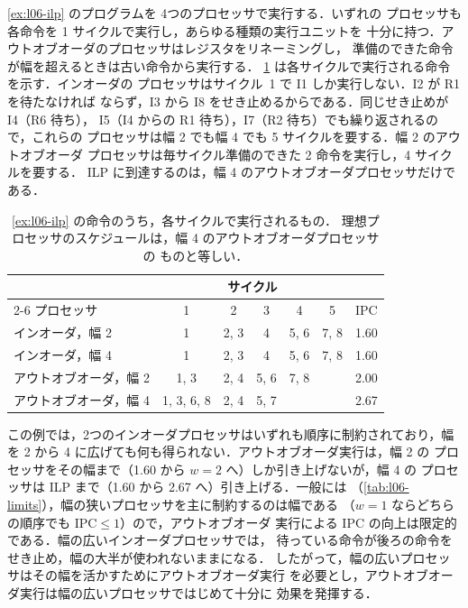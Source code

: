 \documentclass[../main.tex]{subfiles}
\begin{document}
\begin{example}
  \label{ex:l06-ipc}
  \cref{ex:l06-ilp} のプログラムを 4つのプロセッサで実行する．いずれの
  プロセッサも各命令を 1 サイクルで実行し，あらゆる種類の実行ユニットを
  十分に持つ．アウトオブオーダのプロセッサはレジスタをリネーミングし，
  準備のできた命令が幅を超えるときは古い命令から実行する．
  \cref{tab:l06-ipc} は各サイクルで実行される命令を示す．インオーダの
  プロセッサはサイクル~1 で I1 しか実行しない．I2 が R1 を待たなければ
  ならず，I3 から I8 をせき止めるからである．同じせき止めが I4（R6 待ち），
  I5（I4 からの R1 待ち），I7（R2 待ち）でも繰り返されるので，これらの
  プロセッサは幅 2 でも幅 4 でも 5 サイクルを要する．幅 2 のアウトオブオーダ
  プロセッサは毎サイクル準備のできた 2 命令を実行し，4 サイクルを要する．
  ILP に到達するのは，幅 4 のアウトオブオーダプロセッサだけである．
\end{example}

\begin{table}[htbp]
  \centering\small
  \caption{\cref{ex:l06-ilp} の命令のうち，各サイクルで実行されるもの．
    理想プロセッサのスケジュールは，幅 4 のアウトオブオーダプロセッサの
    ものと等しい．}
  \label{tab:l06-ipc}
  \begin{tabular}{@{}lcccccc@{}}
    \toprule
    & \multicolumn{5}{c}{サイクル} & \\
    \cmidrule(lr){2-6}
    プロセッサ & 1 & 2 & 3 & 4 & 5 & IPC \\
    \midrule
    インオーダ，幅 2       & 1          & 2, 3 & 4    & 5, 6 & 7, 8 & 1.60 \\
    インオーダ，幅 4       & 1          & 2, 3 & 4    & 5, 6 & 7, 8 & 1.60 \\
    アウトオブオーダ，幅 2 & 1, 3       & 2, 4 & 5, 6 & 7, 8 &      & 2.00 \\
    アウトオブオーダ，幅 4 & 1, 3, 6, 8 & 2, 4 & 5, 7 &      &      & 2.67 \\
    \bottomrule
  \end{tabular}
\end{table}

この例では，2つのインオーダプロセッサはいずれも順序に制約されており，幅を
2 から 4 に広げても何も得られない．アウトオブオーダ実行は，幅 2 の
プロセッサをその幅まで（1.60 から $w = 2$ へ）しか引き上げないが，幅 4 の
プロセッサは ILP まで（1.60 から 2.67 へ）引き上げる．一般には
（\cref{tab:l06-limits}），幅の狭いプロセッサを主に制約するのは幅である
（$w = 1$ ならどちらの順序でも $\text{IPC} \le 1$）ので，アウトオブオーダ
実行による IPC の向上は限定的である．幅の広いインオーダプロセッサでは，
待っている命令が後ろの命令をせき止め，幅の大半が使われないままになる．
したがって，幅の広いプロセッサはその幅を活かすためにアウトオブオーダ実行
を必要とし，アウトオブオーダ実行は幅の広いプロセッサではじめて十分に
効果を発揮する．
\end{document}
